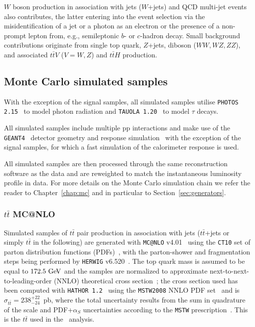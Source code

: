 $W$ boson production  in association with jets ($W$+jets) 
and QCD multi-jet events also contributes, the latter
entering into the event selection via the misidentification of a jet or a photon as an
electron or the presence of a non-prompt lepton from, e.g., semileptonic $b$- or $c$-hadron decay.
Small background contributions originate from single top quark, $Z$+jets, diboson
($WW,WZ,ZZ$), and associated $t\bar{t}V$ ($V=W,Z$) and $t\bar{t}H$ production.

\subsection{Monte Carlo simulated samples}\label{sec:MCbkg}

With the exception of the 
signal samples, all simulated 
samples utilise {\tt PHOTOS 2.15}~\cite{PhotosPaper} to model
photon radiation and {\tt TAUOLA 1.20}~\cite{TauolaPaper} to model
$\tau$ decays.  

All simulated samples include multiple pp
interactions and make use of the  {\tt GEANT4}~\cite{geant}
detector geometry and response simulation~\cite{atlas_sim}
with the exception of the signal samples, for which a fast simulation of
the calorimeter response is used.

All simulated samples are then processed through the same reconstruction 
software as the data and are reweighted to match 
the instantaneous luminosity profile in data. For more details
on the Monte Carlo simulation chain we refer the reader to
Chapter~\ref{chap:mc} and in particular to Section~\ref{sec:generators}.



\subsubsection{$t\bar{t}$ MC@NLO}\label{subsec:MC@NLO}
Simulated samples of $t\bar{t}$ pair production  in association with jets 
($t\bar{t}$+jets or simply $t\bar{t}$ in the following)
are generated with {\tt MC@NLO} v4.01~\cite{mcatnlo_1,mcatnlo_2,mcatnlo_3} using the {\tt CT10} set of parton distribution functions (PDFs)~\cite{ct10},
with the parton-shower and fragmentation steps being performed by 
{\tt HERWIG} v6.520~\cite{HERWIG}.
The top quark mass is assumed to be equal to $172.5\gev$ and 
the samples are normalized to approximate next-to-next-to-leading-order 
(NNLO) theoretical cross section~\cite{ttbarxs}; the cross section used 
has been computed with {\tt HATHOR 1.2}~\cite{ttbarxs} using the {\tt MSTW2008}
NNLO PDF set~\cite{Martin:2009iq} and is $\sigma_{t\bar{t}}= 238^{+22}_{-24}$~pb, 
where the total uncertainty results from the sum in quadrature of the 
scale and PDF+$\alpha_S$ uncertainties according to 
the {\tt MSTW} prescription~\cite{mstw2}. 
This is the $t\bar{t}$ used in the \wbx\ analysis.

